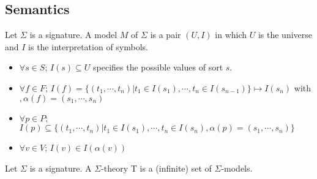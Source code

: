 \subsection{Semantics}

\begin{definition}
Let $\Sigma$ is a signature. A model $M$ of $\Sigma$ is a pair $(U, I)$ in which $U$ is the universe and $I$ is the interpretation of symbols.
\begin{itemize}
\item $\forall s \in S$; $I(s) \subseteq U$ specifies the possible values of sort $s$.
\item $\forall f \in F$; $I(f) = \{(t_1,\cdots, t_n)| t_1 \in I(s_1),\cdots, t_n \in I(s_{n-1})\} \mapsto I(s_n)$ with $, \alpha(f) = (s_1,\cdots, s_n)$
\item $\forall p \in P$; $I(p) \subseteq \{(t_1,\cdots, t_n)| t_1 \in I(s_1),\cdots, t_n \in I(s_n), \alpha(p) = (s_1,\cdots, s_n)\}$
\item $\forall v \in V$; $I(v) \in I(\alpha(v))$
\end{itemize}
\end{definition}

\begin{definition}
Let $\Sigma$ is a signature. A $\Sigma$-theory T is a (infinite) set of $\Sigma$-models.
\end{definition}

